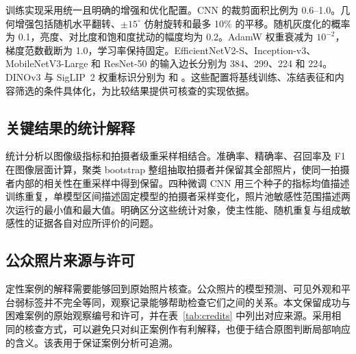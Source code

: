 \documentclass[11pt,a4paper,UTF8,fontset=windows,scheme=plain]{ctexart}
\begin{document}
训练实现采用统一且明确的增强和优化配置。CNN 的裁剪面积比例为 0.6--1.0。几何增强包括随机水平翻转、$\pm15^\circ$ 仿射旋转和最多 10\% 的平移。随机灰度化的概率为 0.1，亮度、对比度和饱和度扰动的幅度均为 0.2。AdamW 权重衰减为 $10^{-2}$，梯度范数截断为 1.0，学习率保持固定。EfficientNetV2-S、Inception-v3、MobileNetV3-Large 和 ResNet-50 的输入边长分别为 384、299、224 和 224。DINOv3 与 SigLIP~2 权重标识分别为  和 。这些配置将基线训练、冻结表征和内容筛选的条件具体化，为比较结果提供可核查的实现依据。

\subsection{关键结果的统计解释}
统计分析以图像级指标和拍摄者级重采样相结合。准确率、精确率、召回率及 F1 在图像层面计算，聚类 bootstrap 整组抽取拍摄者并保留其全部照片，使同一拍摄者内部的相关性在重采样中得到保留。四种微调 CNN 用三个种子的指标均值描述训练重复，单模型区间描述固定模型的拍摄者采样变化，照片池敏感性范围描述两次运行的最小值和最大值。明确区分这些统计对象，使主性能、随机重复与组成敏感性的证据各自对应所评价的问题。


\subsection{公众照片来源与许可}
定性案例的解释需要能够回到原始照片核查。公众照片的模型预测、可见外观和平台弱标签并不完全等同，观察记录能够帮助检查它们之间的关系。本文保留成功与困难案例的原始观察编号和许可，并在表~\ref{tab:credits} 中列出对应来源。采用相同的核查方式，可以避免只对纠正案例作有利解释，也便于结合原图判断局部响应的含义。该表用于保证案例分析可追溯。



\FloatBarrier
\end{document}
